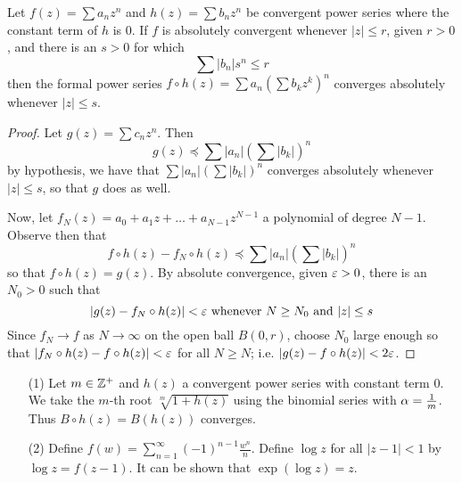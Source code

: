 \begin{theorem}\label{2.3.5}
    Let $f(z)=\sum{a_nz^n}$ and $h(z)=\sum{b_nz^n}$ be convergent power series
    where the constant term of $h$ is  $0$. If  $f$ is absolutely convergent
    whenever  $|z| \leq r$, given $r>0$, and there is an  $s>0$ for which
    \begin{equation*}
        \sum{|b_n|s^n} \leq r
    \end{equation*}
    then the formal power series $f \circ h(z)=\sum{a_n(\sum{b_kz^k})^n}$
    converges absolutely whenever $|z| \leq s$.
\end{theorem}
\begin{proof}
    Let $g(z)=\sum{c_nz^n}$. Then
    \begin{equation*}
        g(z) \preceq \sum{|a_n|(\sum{|b_k|})^n}
    \end{equation*}
    by hypothesis, we have that $\sum{|a_n|(\sum{|b_k|})^n}$ converges
    absolutely whenever $|z| \leq s$, so that  $g$ does as well.

    Now, let  $f_N(z)=a_0+a_1z+\dots+a_{N-1}z^{N-1}$ a polynomial of degree
    $N-1$. Observe then that
    \begin{equation*}
        f \circ h(z)-f_N \circ h(z) \preceq \sum{|a_n|(\sum{|b_k|})^n}
    \end{equation*}
    so that $f \circ h(z)=g(z)$. By absolute convergence, given $\varepsilon>0$, there is
    an $N_0>0$ such that
    \begin{equation*}
        |g(z)-f_N \circ h(z)|<\varepsilon \text{ whenever } N \geq N_0 \text{ and } |z|
        \leq s
    \end{equation*}
    Since $f_N \xrightarrow{} f$ as $N \xrightarrow{} \infty$ on the open ball
    $B(0,r)$, choose $N_0$ large enough so that $|f_N \circ h(z)-f \circ
    h(z)|<\varepsilon$ for all $N \geq N$; i.e.  $|g(z)-f \circ h(z)|<2\varepsilon$.
\end{proof}

\begin{example}\label{exmaple_2.7}
    \begin{enumerate}
        \item[(1)] Let $m \in \mathbb{Z}^+$ and  $h(z)$ a convergent power series with
            constant term $0$. We take the  $m$-th root $\sqrt[m]{1+h(z)}$
            using the binomial series with $\alpha=\frac{1}{m}$. Thus
            $B \circ h(z)=B(h(z))$ converges.

        \item[(2)] Define $f(w)=\sum_{n=1}^\infty{(-1)^{n-1}\frac{w^n}{n}}$.
            Define $\log{z}$ for all $|z-1|<1$ by $\log{z}=f(z-1)$. It can be
            shown that $\exp{(\log{z})}=z$.
    \end{enumerate}
\end{example}
